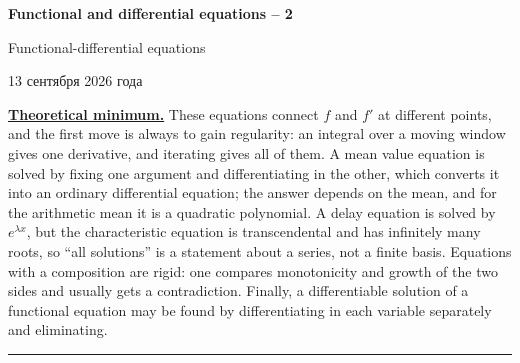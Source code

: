 \documentclass[11pt,a4paper]{article}
\newcommand{\head}[1]{\par\medskip\noindent\textbf{\underline{#1}}\quad}
\newcommand{\sheettitle}[4]{%
  \begin{center}
  {\huge\bfseries #1\par}\vspace{1.2em}
  {\Large #2\par}\vspace{0.8em}
  \if\relax\detokenize{#3}\relax\else{\Large #3\par}\vspace{0.8em}\fi
  {\foreignlanguage{russian}{#4}\par}
  \end{center}\vspace{0.5em}}
\begin{document}
\sheettitle{Functional and differential equations -- 2}{Functional-differential equations}{Homework}{13 сентября 2026 года}

\head{Theoretical minimum.} These equations connect $f$ and $f'$ at different points, and the first move
is always to gain regularity: an integral over a moving window gives one derivative, and iterating gives
all of them. A mean value equation is solved by fixing one argument and differentiating in the other,
which converts it into an ordinary differential equation; the answer depends on the mean, and for the
arithmetic mean it is a quadratic polynomial. A delay equation is solved by $e^{\lambda x}$, but the
characteristic equation is transcendental and has infinitely many roots, so ``all solutions'' is a
statement about a series, not a finite basis. Equations with a composition are rigid: one compares
monotonicity and growth of the two sides and usually gets a contradiction. Finally, a differentiable
solution of a functional equation may be found by differentiating in each variable separately and
eliminating.

\medskip\noindent\rule{\linewidth}{0.4pt}
\end{document}
